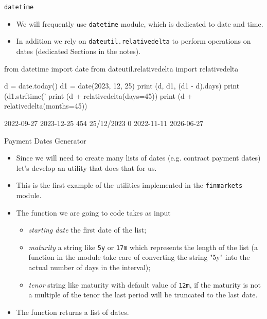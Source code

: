 \documentclass{beamer}
\begin{document}
\begin{frame}[fragile]{\texttt{datetime}}
  \begin{itemize}
  \item We will frequently use \texttt{datetime} module, which is dedicated to date and time.
  \item In addition we rely on \texttt{dateutil.relativedelta} to perform operations on dates (dedicated Sections in the notes).
  \end{itemize}
  \begin{ipython}
from datetime import date
from dateutil.relativedelta import relativedelta
		
d = date.today()
d1 = date(2023, 12, 25)
print (d, d1, (d1 - d).days)
print (d1.strftime('%
print (d + relativedelta(days=45))
print (d + relativedelta(months=45))
\end{ipython}
\begin{ioutput}
2022-09-27 2023-12-25 454
25/12/2023 0
2022-11-11
2026-06-27
\end{ioutput}
\end{frame}

\begin{frame}{Payment Dates Generator}
  \begin{itemize}
  \item Since we will need to create many lists of dates (e.g. contract payment dates) let's develop an utility that does that for us.
  \item This is the first example of the utilities implemented in the \texttt{finmarkets} module.
  \item The function we are going to code takes as input
    \begin{itemize}
    \item \emph{starting date} the first date of the list;
    \item \emph{maturity} a string like \texttt{5y} or \texttt{17m} which represents the length of the list (a function in the module take care of converting the string "5y" into the actual number of days in the interval);
    \item \emph{tenor} string like maturity with default value of \texttt{12m}, if the maturity is not a multiple of the tenor the last period will be truncated to the last date.
    \end{itemize}
  \item The function returns a list of dates.
  \end{itemize}		
\end{frame}
\end{document}
